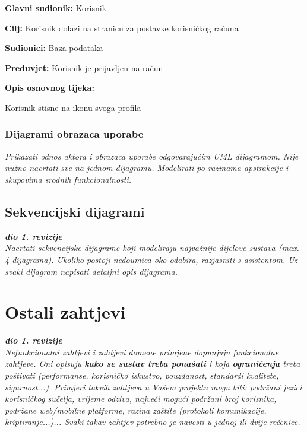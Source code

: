 					\noindent {}
					\begin{packed_item}
						\item \textbf{Glavni sudionik:} Korisnik
						\item \textbf{Cilj:} Korisnik dolazi na stranicu za postavke korisničkog računa
						\item \textbf{Sudionici:} Baza podataka
						\item \textbf{Preduvjet:} Korisnik je prijavljen na račun
						\item \textbf{Opis osnovnog tijeka:}
						\begin{packed_enum}
							\item Korisnik stisne na ikonu svoga profila
						\end{packed_enum}
					\end{packed_item}


				\subsubsection{Dijagrami obrazaca uporabe}
					
					\textit{Prikazati odnos aktora i obrazaca uporabe odgovarajućim UML dijagramom. Nije nužno nacrtati sve na jednom dijagramu. Modelirati po razinama apstrakcije i skupovima srodnih funkcionalnosti.}
				\eject		
				
			\subsection{Sekvencijski dijagrami}
				
				\textbf{\textit{dio 1. revizije}}\\
				
				\textit{Nacrtati sekvencijske dijagrame koji modeliraju najvažnije dijelove sustava (max. 4 dijagrama). Ukoliko postoji nedoumica oko odabira, razjasniti s asistentom. Uz svaki dijagram napisati detaljni opis dijagrama.}
				\eject
	
		\section{Ostali zahtjevi}
		
			\textbf{\textit{dio 1. revizije}}\\
		 
			 \textit{Nefunkcionalni zahtjevi i zahtjevi domene primjene dopunjuju funkcionalne zahtjeve. Oni opisuju \textbf{kako se sustav treba ponašati} i koja \textbf{ograničenja} treba poštivati (performanse, korisničko iskustvo, pouzdanost, standardi kvalitete, sigurnost...). Primjeri takvih zahtjeva u Vašem projektu mogu biti: podržani jezici korisničkog sučelja, vrijeme odziva, najveći mogući podržani broj korisnika, podržane web/mobilne platforme, razina zaštite (protokoli komunikacije, kriptiranje...)... Svaki takav zahtjev potrebno je navesti u jednoj ili dvije rečenice.}
			 
			 
			 
	
